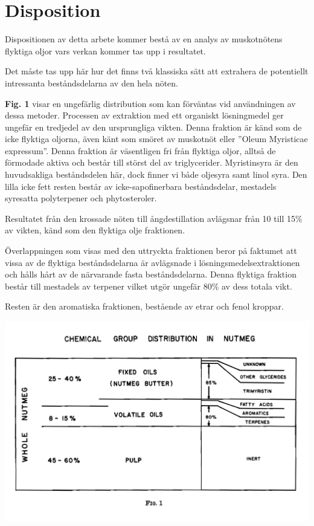 \documentclass{theme/franska}
\begin{document}
\pagebreak

\section{Disposition}

Dispositionen av detta arbete kommer bestå av en analys av muskotnötens flyktiga oljor
vars verkan kommer tas upp i resultatet.

Det måste tas upp här hur det finns två klassiska sätt att extrahera de potentiellt intressanta beståndsdelarna av den hela nöten.

\textbf{Fig. 1} \cite{shulgin1967chemistry} visar en ungefärlig distribution som kan förväntas vid användningen av dessa metoder. Processen av extraktion med ett organiskt lösningmedel ger ungefär en tredjedel av den ursprungliga vikten. Denna fraktion är känd som de icke flyktiga oljorna, även känt som smöret av muskotnöt eller ''Oleum Myristicae expressum''. Denna fraktion är väsentligen fri från flyktiga oljor, alltså de förmodade aktiva och består till störst del av triglycerider. Myristinsyra är den huvudsakliga beståndsdelen här, dock finner vi både oljesyra samt linol syra. Den lilla icke fett resten består av icke-sapofinerbara beståndsdelar, mestadels syresatta polyterpener och phytosteroler. \cite{shulgin1967chemistry}

Resultatet från den krossade nöten till ångdestillation avlägsnar från 10 till 15\% av vikten, känd som den flyktiga olje fraktionen.

Överlappningen som visas med den uttryckta fraktionen beror på faktumet att vissa av de flyktiga beståndsdelarna är avlägsnade i lösningsmedelsextraktionen och hålls hårt av de närvarande fasta beståndsdelarna.
Denna flyktiga fraktion består till mestadels av terpener vilket utgör ungefär 80\% av dess totala vikt.

Resten är den aromatiska fraktionen, bestående av etrar och fenol kroppar.\cite{shulgin1967chemistry}


\includegraphics[scale=0.122]{Figure1}
\end{document}
